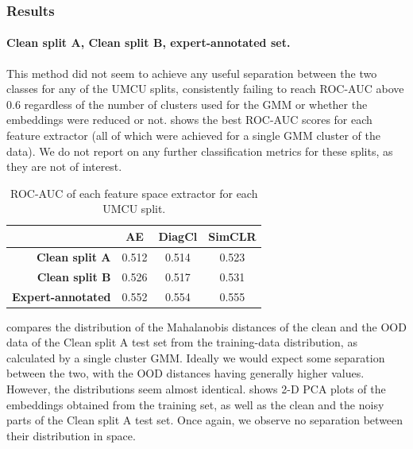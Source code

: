 \documentclass[a4paper,10pt]{article}
\begin{document}
\subsubsection{Results}

\paragraph{Clean split A, Clean split B, expert-annotated set.} This method did not seem to achieve any useful separation between the two classes for any of the UMCU splits, consistently failing to reach ROC-AUC above 0.6 regardless of the number of clusters used for the GMM or whether the embeddings were reduced or not.  shows the best ROC-AUC scores for each feature extractor (all of which were achieved for a single GMM cluster of the data). We do not report on any further classification metrics for these splits, as they are not of interest.

\begin{table}[htbp]
	\centering
	\begin{tabular}{r|c|c|c}
		                          & \textbf{AE} & \textbf{DiagCl} & \textbf{SimCLR} \\ \midrule
		\textbf{Clean split A}    & 0.512       & 0.514           & 0.523           \\
		\textbf{Clean split B}    & 0.526       & 0.517           & 0.531           \\
		\textbf{Expert-annotated} & 0.552       & 0.554           & 0.555
	\end{tabular}
	\caption{ROC-AUC of each feature space extractor for each UMCU split.}
	\label{tab:roc-auc_feature_umcu}
\end{table}

 compares the distribution of the Mahalanobis distances of the clean and the OOD data of the Clean split A test set from the training-data distribution, as calculated by a single cluster GMM. Ideally we would expect some separation between the two, with the OOD distances having generally higher values. However, the distributions seem almost identical.  shows 2-D PCA plots of the embeddings obtained from the training set, as well as the clean and the noisy parts of the Clean split A test set. Once again, we observe no separation between their distribution in space.
\end{document}
